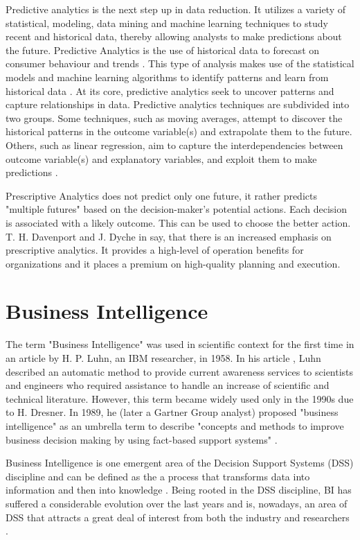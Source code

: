 \documentclass[runningheads]{llncs}
\begin{document}
Predictive analytics is the next step up in data reduction. It utilizes a variety of statistical, modeling, data mining and machine learning techniques to study recent and historical data, thereby allowing analysts to make predictions about the future\cite{CHARTER}. Predictive Analytics is the use of historical data to forecast on consumer behaviour and trends \cite{TALLIN}. This type of analysis makes use of the statistical models and machine learning algorithms to identify patterns and learn from historical data \cite{MIS}. At its core, predictive analytics seek to uncover patterns and capture relationships in data. Predictive analytics techniques are subdivided into two groups. Some techniques, such as moving averages, attempt to discover the historical patterns in the outcome variable(s) and extrapolate them to the future. Others, such as linear regression, aim to capture the interdependencies between outcome variable(s) and explanatory variables, and exploit them to make predictions \cite{ELS}.

Prescriptive Analytics does not predict only one future, it rather predicts "multiple futures" based on the decision-maker's potential actions. Each decision is associated with a likely outcome. This can be used to choose the better action. T. H. Davenport and J. Dyche in \cite{DAVENPORT} say, that there is an increased emphasis on prescriptive analytics. It provides a high-level of operation benefits for organizations and it places a premium on high-quality planning and execution. 

\section{Business Intelligence}

The term "Business Intelligence" was used in scientific context for the first time in an article by H. P. Luhn, an IBM researcher, in 1958. In his article \cite{LUHN}, Luhn described an automatic method to provide current awareness services to scientists and engineers who required assistance to handle an increase of scientific and technical literature. However, this term became widely used only in the 1990s due to H. Dresner. In 1989, he (later a Gartner Group analyst) proposed "business intelligence" as an umbrella term to describe "concepts and methods to improve business decision making by using fact-based support systems" \cite{POWER}. 

Business Intelligence is one emergent area of the Decision Support Systems (DSS) discipline and can be defined as the a process that transforms data into information and then into knowledge \cite{GOLFARELLI}. Being rooted in the DSS discipline, BI has suffered a considerable evolution over the last years and is, nowadays, an area of DSS that attracts a great deal of interest from both the industry and researchers \cite{SHOLLO}.
\end{document}
